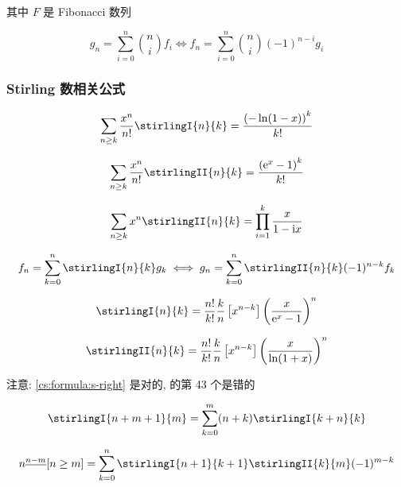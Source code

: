 其中 \(F\) 是 Fibonacci 数列

\begin{equation}
    g_n = \sum_{i = 0}^{n} \binom{n}{i} f_i \iff f_n = \sum_{i = 0}^{n} \binom{n}{i} (-1)^{n-i} g_i
\end{equation}

\subsubsection{Stirling 数相关公式}

\begin{equation}
    \sum_{n\geq k}\frac{x^n}{n!}\stirlingI{n}{k}=\frac{\left(-\ln(1-x)\right)^k}{k!}
\end{equation}

\begin{equation}
    \sum_{n\geq k}\frac{x^n}{n!}\stirlingII{n}{k}=\frac{\left(\mathrm{e}^x-1\right)^k}{k!}
\end{equation}

\begin{equation}
    \sum_{n\geq k}x^n\stirlingII{n}{k}=\prod_{i=1}^k\frac{x}{1-\mathrm{i}x}
\end{equation}

\begin{equation}
    f_n=\sum_{k=0}^n\stirlingI{n}{k}g_k \iff g_n=\sum_{k=0}^n\stirlingII{n}{k}(-1)^{n-k}f_k
\end{equation}

\begin{equation}
    \stirlingI{n}{k}=\frac{n!}{k!}\frac{k}{n}\left[x^{n-k}\right]\left(\frac{x}{\mathrm{e}^x-1}\right)^n
\end{equation}

\begin{equation}
    \stirlingII{n}{k}=\frac{n!}{k!}\frac{k}{n}\left[x^{n-k}\right]\left(\frac{x}{\ln(1+x)}\right)^n
\end{equation}

注意: \eqref{cs:formula:s-right} 是对的,  的第 43 个是错的

\begin{equation}
    \label{cs:formula:s-right}
    \stirlingI{n+m+1}{m}=\sum_{k=0}^m(n+k)\stirlingI{k+n}{k}
\end{equation}

\begin{equation}
    n^{\underline{n-m}}[n\geq m]=\sum_{k=0}^n\stirlingI{n+1}{k+1}\stirlingII{k}{m}(-1)^{m-k}
\end{equation}

